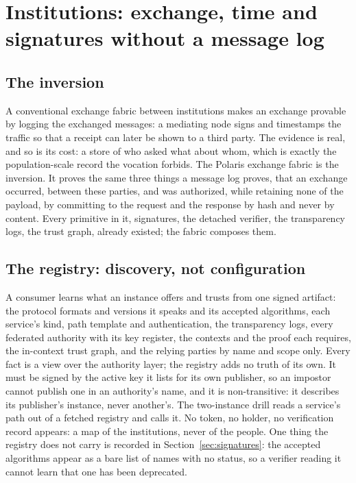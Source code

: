 \section{Institutions: exchange, time and signatures without a message log}
\label{sec:institutions}



\subsection{The inversion}

A conventional exchange fabric between institutions makes an exchange provable by logging the
exchanged messages: a mediating node signs and timestamps the traffic so that a receipt can later be
shown to a third party. The evidence is real, and so is its cost: a store of who asked what about
whom, which is exactly the population-scale record the vocation forbids. The Polaris exchange fabric
is the inversion. It proves the same three things a message log proves, that an exchange occurred,
between these parties, and was authorized, while retaining none of the payload, by committing to the
request and the response by hash and never by content. Every primitive in it, signatures, the
detached verifier, the transparency logs, the trust graph, already existed; the fabric composes them.
\sImpl

\subsection{The registry: discovery, not configuration}

A consumer learns what an instance offers and trusts from one signed artifact: the protocol formats
and versions it speaks and its accepted algorithms, each service's kind, path template and
authentication, the transparency logs, every federated authority with its key register, the
contexts and the proof each requires, the in-context trust graph, and the relying parties by name
and scope only. Every fact is a view over the authority layer; the registry adds no truth of its own.
It must be signed by the active key it lists for its own publisher, so an impostor cannot publish one
in an authority's name, and it is non-transitive: it describes its publisher's instance, never
another's. The two-instance drill reads a service's path out of a fetched registry and calls it. No
token, no holder, no verification record appears: a map of the institutions, never of the people.
One thing the registry does not carry is recorded in Section~\ref{sec:signatures}: the accepted
algorithms appear as a bare list of names with no status, so a verifier reading it cannot learn that
one has been deprecated. \sImpl

